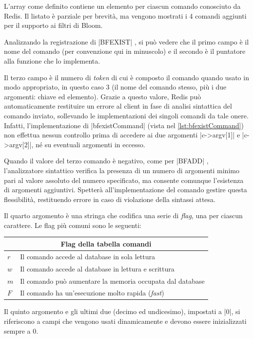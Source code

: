L'array come definito contiene un elemento per ciascun comando conosciuto da Redis. Il listato è
parziale per brevità, ma vengono mostrati i 4 comandi aggiunti per il supporto ai filtri di Bloom.

Analizzando la registrazione di \cverb|BFEXIST| , si può vedere che il primo campo è il nome
del comando (per convenzione qui in minuscolo) e il secondo è il puntatore alla funzione che lo
implementa.

Il terzo campo è il numero di \emph{token} di cui è composto il comando quando usato in modo
appropriato, in questo caso $3$ (il nome del comando stesso, più i due argomenti: chiave ed
elemento). Grazie a questo valore, Redis può automaticamente restituire un errore al client in fase
di analisi sintattica del comando inviato, sollevando le implementazioni dei singoli comandi da tale
onere. Infatti, l'implementazione di \cverb|bfexistCommand| (vista nel \autoref{lst:bfexistCommand})
non effettua nessun controllo prima di accedere ai due argomenti \cverb|c->argv[1]| e
\cverb|c->argv[2]|, né su eventuali argomenti in eccesso.

Quando il valore del terzo comando è negativo, come per \cverb|BFADD| , l'analizzatore
sintattico verifica la presenza di un numero di argomenti minimo pari al valore assoluto del numero
specificato, ma consente comunque l'esistenza di argomenti aggiuntivi. Spetterà all'implementazione
del comando gestire questa flessibilità, restituendo errore in caso di violazione della sintassi
attesa.

Il quarto argomento è una stringa che codifica una serie di \emph{flag}, una per ciascun carattere.
Le flag più comuni sono le seguenti:

\medskip
\begin{tabular}{ |l|l| }

  \multicolumn{2}{c}{Flag della tabella comandi} \\
  \hline
  $r$ & Il comando accede al database in sola lettura \\
  $w$ & Il comando accede al database in lettura e scrittura \\
  $m$ & Il comando può aumentare la memoria occupata dal database \\
  $F$ & Il comando ha un'esecuzione molto rapida (\emph{fast}) \\
  \hline
\end{tabular}
\medskip

Il quinto argomento e gli ultimi due (decimo ed undicesimo), impostati a \cverb|0|, si riferiscono 
a campi che vengono usati dinamicamente e devono essere inizializzati sempre a $0$.

